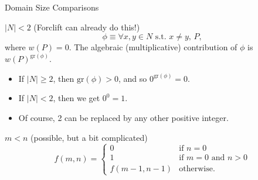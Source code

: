 \documentclass{beamer}
\begin{document}
\begin{frame}{Domain Size Comparisons}
  \begin{block}{$|N| < 2$ (Forclift can already do this!)}
    \[
    \phi \equiv \forall x, y \in N \text{ s.t. } x \ne y\text{, } P,
    \]
    where $w(P) = 0$. The algebraic (multiplicative) contribution of $\phi$ is $w(P)^{\mathrm{gr}(\phi)}$.
    \begin{itemize}
    \item If $|N| \ge 2$, then $\mathrm{gr}(\phi) > 0$, and so $0^{\mathrm{gr}(\phi)} = 0$.
    \item If $|N| < 2$, then we get $0^0 = 1$.
    \item Of course, 2 can be replaced by any other positive integer.
    \end{itemize}
  \end{block}
  \pause
  \begin{block}{$m < n$ (possible, but a bit complicated)}
    \[
    f(m, n) = \begin{cases}
      0 & \text{if } n = 0 \\
      1 & \text{if } m = 0 \text{ and } n > 0 \\
      f(m-1, n-1) & \text{otherwise.}
    \end{cases}
    \]
  \end{block}
\end{frame}
\end{document}
